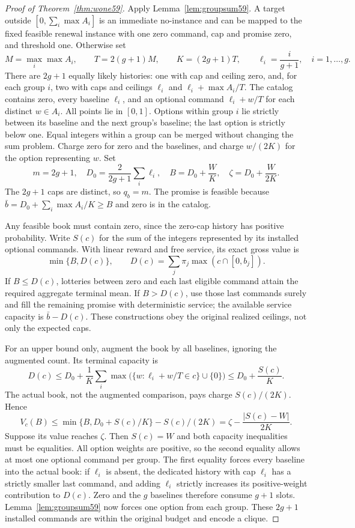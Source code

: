 \begin{proof}[Proof of Theorem~\ref{thm:wone59}]
Apply Lemma~\ref{lem:groupsum59}. A target outside $[0,\sum_i\max A_i]$ is an immediate no-instance and can be mapped to the fixed feasible renewal instance with one zero command, cap and promise zero, and threshold one. Otherwise set
\[
 M=\max_i\max A_i,\qquad T=2(g+1)M,\qquad K=(2g+1)T,
 \qquad \ell_i=\frac{i}{g+1},\quad i=1,\ldots,g.
\]
There are $2g+1$ equally likely histories: one with cap and ceiling zero, and, for each group $i$, two with caps and ceilings $\ell_i$ and $\ell_i+\max A_i/T$. The catalog contains zero, every baseline $\ell_i$, and an optional command $\ell_i+w/T$ for each distinct $w\in A_i$. All points lie in $[0,1]$. Options within group $i$ lie strictly between its baseline and the next group's baseline; the last option is strictly below one. Equal integers within a group can be merged without changing the sum problem. Charge zero for zero and the baselines, and charge $w/(2K)$ for the option representing $w$. Set
\begin{equation}\label{eq:budgetreduction59}
 m=2g+1,\quad D_0=\frac{2}{2g+1}\sum_i\ell_i,\quad
 B=D_0+\frac{W}{K},\quad \zeta=D_0+\frac{W}{2K}.
\end{equation}
The $2g+1$ caps are distinct, so $q_b=m$. The promise is feasible because
$\bar b=D_0+\sum_i\max A_i/K\geq B$ and zero is in the catalog.

Any feasible book must contain zero, since the zero-cap history has positive probability. Write $S(c)$ for the sum of the integers represented by its installed optional commands. With linear reward and free service, its exact gross value is
\[
 \min\{B,D(c)\},\qquad D(c)=\sum_j\pi_j\max(c\cap[0,b_j]).
\]
If $B\leq D(c)$, lotteries between zero and each last eligible command attain the required aggregate terminal mean. If $B>D(c)$, use those last commands surely and fill the remaining promise with deterministic service; the available service capacity is $\bar b-D(c)$. These constructions obey the original realized ceilings, not only the expected caps.

For an upper bound only, augment the book by all baselines, ignoring the augmented count. Its terminal capacity is
\[
 D(c)\leq D_0+\frac{1}{K}\sum_i\max\bigl(\{w:\ell_i+w/T\in c\}\cup\{0\}\bigr)
 \leq D_0+\frac{S(c)}{K}.
\]
The actual book, not the augmented comparison, pays charge $S(c)/(2K)$. Hence
\begin{equation}\label{eq:keyparam59}
 V_c(B)\leq \min\{B,D_0+S(c)/K\}-S(c)/(2K)
       =\zeta-\frac{|S(c)-W|}{2K}.
\end{equation}
Suppose its value reaches $\zeta$. Then $S(c)=W$ and both capacity inequalities must be equalities. All option weights are positive, so the second equality allows at most one optional command per group. The first equality forces every baseline into the actual book: if $\ell_i$ is absent, the dedicated history with cap $\ell_i$ has a strictly smaller last command, and adding $\ell_i$ strictly increases its positive-weight contribution to $D(c)$. Zero and the $g$ baselines therefore consume $g+1$ slots. Lemma~\ref{lem:groupsum59} now forces one option from each group. These $2g+1$ installed commands are within the original budget and encode a clique.


\end{proof}

